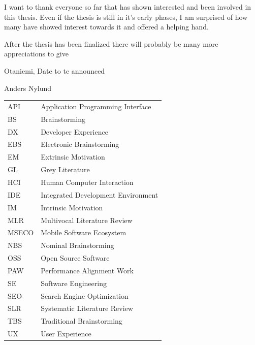 \documentclass[english, 12pt, a4paper, sci, utf8, a-1b, online]{aaltothesis}
\begin{document}
I want to thank everyone so far that has shown interested and been involved in this thesis. Even if the thesis is still in it's early phases, I am surprised of how many have showed interest towards it and offered a helping hand.

After the thesis has been finalized there will probably be many more appreciations to give

\vspace{5cm}
Otaniemi, Date to te announced

\vspace{5mm}
{\hfill Anders Nylund \hspace{1cm}}

\newpage


\thesistableofcontents


\begin{tabular}{ll}
  API   & Application Programming Interface  \\
  BS    & Brainstorming                      \\
  DX    & Developer Experience               \\
  EBS   & Electronic Brainstorming           \\
  EM    & Extrinsic Motivation               \\
  GL    & Grey Literature                    \\
  HCI   & Human Computer Interaction         \\
  IDE   & Integrated Development Environment \\
  IM    & Intrinsic Motivation               \\
  MLR   & Multivocal Literature Review       \\
  MSECO & Mobile Software Ecosystem          \\
  NBS   & Nominal Brainstorming              \\
  OSS   & Open Source Software               \\
  PAW   & Performance Alignment Work         \\
  SE    & Software Engineering               \\
  SEO   & Search Engine Optimization         \\
  SLR   & Systematic Literature Review       \\
  TBS   & Traditional Brainstorming          \\
  UX    & User Experience                    \\
\end{tabular}
\end{document}
